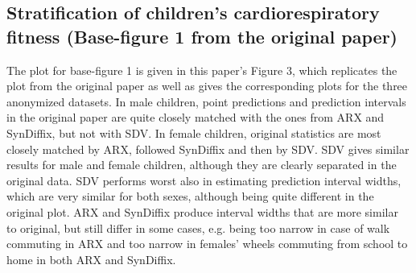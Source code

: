\documentclass[10pt]{article}
\begin{document}
%
%

\subsection*{Stratification of children's cardiorespiratory fitness (Base-figure 1 from the original paper)}

The plot for base-figure 1 is given in this paper's Figure 3, which replicates the plot from the original paper as well as gives the corresponding plots for the three anonymized datasets.
In male children, point predictions and prediction intervals in the original paper are quite closely matched with the ones from ARX and SynDiffix, but not with SDV. 
In female children, original statistics are most closely matched by ARX, followed SynDiffix and then by SDV.
SDV gives similar results for male and female children, although they are clearly separated in the original data. SDV performs worst also in estimating prediction interval widths, which are very similar for both sexes, although being quite different in the original plot. ARX and SynDiffix produce interval widths that are more similar to original, but still differ in some cases, e.g. being too narrow in case of walk commuting in ARX and too narrow in females' wheels commuting from school to home in both ARX and SynDiffix.
\end{document}
